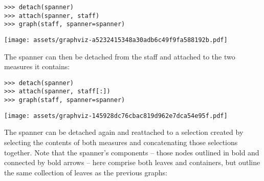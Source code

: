 \begin{comment}
<abjad>
detach(spanner)
attach(spanner, staff)
graph(staff, spanner=spanner)
</abjad>
\end{comment}

\begin{abjadbookoutput}
\begin{singlespacing}
\vspace{-0.5\baselineskip}
\begin{lstlisting}
>>> detach(spanner)
>>> attach(spanner, staff)
>>> graph(staff, spanner=spanner)
\end{lstlisting}
\noindent\texttt{[image: assets/graphviz-a5232415348a30adb6c49f9fa588192b.pdf]}
\end{singlespacing}
\end{abjadbookoutput}

The spanner can then be detached from the staff and attached to the two
measures it contains:

\begin{comment}
<abjad>
detach(spanner)
attach(spanner, staff[:])
graph(staff, spanner=spanner)
</abjad>
\end{comment}

\begin{abjadbookoutput}
\begin{singlespacing}
\vspace{-0.5\baselineskip}
\begin{lstlisting}
>>> detach(spanner)
>>> attach(spanner, staff[:])
>>> graph(staff, spanner=spanner)
\end{lstlisting}
\noindent\texttt{[image: assets/graphviz-145928dc76cbac819d962e7dca54e95f.pdf]}
\end{singlespacing}
\end{abjadbookoutput}

The spanner can be detached again and reattached to a selection created by
selecting the contents of both measures and concatenating those selections
together. Note that the spanner's components -- those nodes outlined in bold
and connected by bold arrows -- here comprise both leaves and containers, but
outline the same collection of leaves as the previous graphs:

\begin{comment}
<abjad>
detach(spanner)
attach(spanner, measure_one[:] + measure_two[:])
graph(staff, spanner=spanner)
</abjad>
\end{comment}

